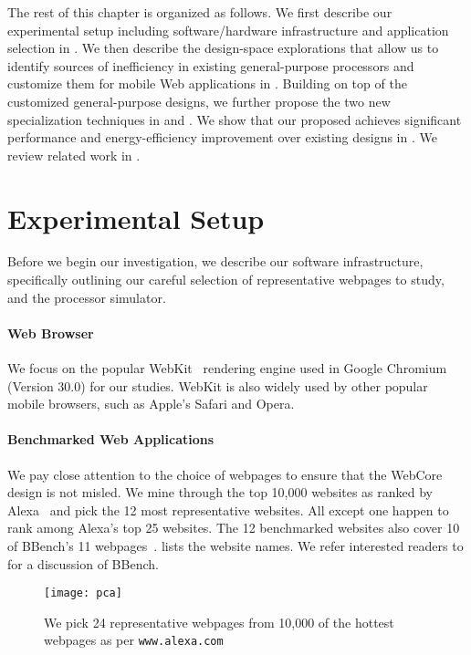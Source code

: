 The rest of this chapter is organized as follows. We first describe our experimental setup including software/hardware infrastructure and application selection in . We then describe the design-space explorations that allow us to identify sources of inefficiency in existing general-purpose processors and customize them for mobile Web applications in . Building on top of the customized general-purpose designs, we further propose the two new specialization techniques in  and . We show that our proposed \webcore achieves significant performance and energy-efficiency improvement over existing designs in . We review related work in .

\section{Experimental Setup}
\label{sec:arch:exp}

Before we begin our investigation, we describe our software infrastructure, specifically outlining our careful selection of representative webpages to study, and the processor simulator. 

\paragraph{Web Browser} We focus on the popular WebKit~\cite{webkit} rendering engine used in Google Chromium (Version 30.0) for our studies. WebKit is also widely used by other popular mobile browsers, such as Apple's Safari and Opera.

\paragraph{Benchmarked Web Applications}  We pay close attention to the choice of webpages to ensure that the WebCore design is not misled. We mine through the top 10,000 websites as ranked by Alexa~\cite{alexa} and pick the 12 most representative websites. All except one happen to rank among Alexa's top 25 websites. The 12 benchmarked websites also cover 10 of BBench's 11 webpages~\cite{BBench}.  lists the website names. We refer interested readers to  for a discussion of BBench. 

\begin{figure}[t]
  \centering
  \texttt{[image: pca]}
  \caption{We pick 24 representative webpages from 10,000 of the hottest webpages as per \texttt{www.alexa.com}}
  \label{fig:pca}
\end{figure}

